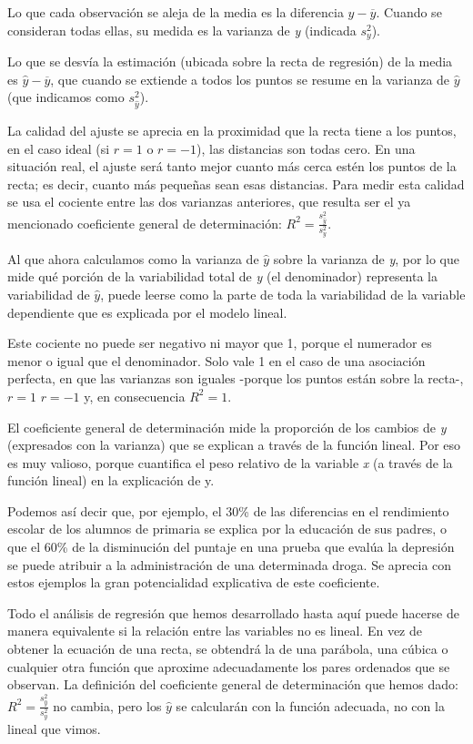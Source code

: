 \documentclass[]{book}
\begin{document}
Lo que cada observación se aleja de la media es la diferencia
\(y - \overline{y}\). Cuando se consideran todas ellas, su medida es la
varianza de \emph{y} (indicada \(s_{y}^{2}\)).

Lo que se desvía la estimación (ubicada sobre la recta de regresión) de
la media es \(\widehat{y} - \overline{y}\), que cuando se extiende a todos
los puntos se resume en la varianza de \(\widehat{y}\) (que indicamos como
\(s_{\widehat{y}}^{2}\)).

La calidad del ajuste se aprecia en la proximidad que la recta tiene a
los puntos, en el caso ideal (si \(r = 1\) o \(r = - 1\)), las distancias
son todas cero. En una situación real, el ajuste será tanto mejor cuanto
más cerca estén los puntos de la recta; es decir, cuanto más pequeñas
sean esas distancias. Para medir esta calidad se usa el cociente entre
las dos varianzas anteriores, que resulta ser el ya mencionado
coeficiente general de determinación:
\(R^{2} = \frac{s_{\widehat{y}}^{2}}{s_{y}^{2}}\).

Al que ahora calculamos como la varianza de \(\widehat{y}\) sobre la
varianza de \emph{y}, por lo que mide qué porción de la variabilidad total de
\emph{y} (el denominador) representa la variabilidad de \(\widehat{y}\), puede
leerse como la parte de toda la variabilidad de la variable dependiente
que es explicada por el modelo lineal.

Este cociente no puede ser negativo ni mayor que 1, porque el numerador
es menor o igual que el denominador. Solo vale 1 en el caso de una
asociación perfecta, en que las varianzas son iguales -porque los puntos
están sobre la recta-, \(r = 1\) \(r = - 1\) y, en consecuencia \(R^2=1\).

El coeficiente general de determinación mide la proporción de los
cambios de \emph{y} (expresados con la varianza) que se explican a través de
la función lineal. Por eso es muy valioso, porque cuantifica el peso
relativo de la variable \emph{x} (a través de la función lineal) en la
explicación de y.

Podemos así decir que, por ejemplo, el 30\% de las diferencias en el
rendimiento escolar de los alumnos de primaria se explica por la
educación de sus padres, o que el 60\% de la disminución del puntaje en
una prueba que evalúa la depresión se puede atribuir a la administración
de una determinada droga. Se aprecia con estos ejemplos la gran
potencialidad explicativa de este coeficiente.

Todo el análisis de regresión que hemos desarrollado hasta aquí puede
hacerse de manera equivalente si la relación entre las variables no es
lineal. En vez de obtener la ecuación de una recta, se obtendrá la de
una parábola, una cúbica o cualquier otra función que aproxime
adecuadamente los pares ordenados que se observan. La definición del
coeficiente general de determinación que hemos dado:
\(R^{2} = \frac{s_{\widehat{y}}^{2}}{s_{y}^{2}}\) no cambia, pero los
\(\widehat{y}\) se calcularán con la función adecuada, no con la lineal
que vimos.
\end{document}
